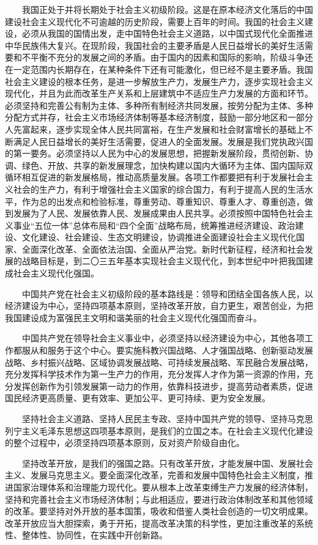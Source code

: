 　　我国正处于并将长期处于社会主义初级阶段。这是在原本经济文化落后的中国建设社会主义现代化不可逾越的历史阶段，需要上百年的时间。我国的社会主义建设，必须从我国的国情出发，走中国特色社会主义道路，以中国式现代化全面推进中华民族伟大复兴。在现阶段，我国社会的主要矛盾是人民日益增长的美好生活需要和不平衡不充分的发展之间的矛盾。由于国内的因素和国际的影响，阶级斗争还在一定范围内长期存在，在某种条件下还有可能激化，但已经不是主要矛盾。我国社会主义建设的根本任务，是进一步解放生产力，发展生产力，逐步实现社会主义现代化，并且为此而改革生产关系和上层建筑中不适应生产力发展的方面和环节。必须坚持和完善公有制为主体、多种所有制经济共同发展，按劳分配为主体、多种分配方式并存，社会主义市场经济体制等基本经济制度，鼓励一部分地区和一部分人先富起来，逐步实现全体人民共同富裕，在生产发展和社会财富增长的基础上不断满足人民日益增长的美好生活需要，促进人的全面发展。发展是我们党执政兴国的第一要务。必须坚持以人民为中心的发展思想，把握新发展阶段，贯彻创新、协调、绿色、开放、共享的新发展理念，加快构建以国内大循环为主体、国内国际双循环相互促进的新发展格局，推动高质量发展。各项工作都要把有利于发展社会主义社会的生产力，有利于增强社会主义国家的综合国力，有利于提高人民的生活水平，作为总的出发点和检验标准，尊重劳动、尊重知识、尊重人才、尊重创造，做到发展为了人民、发展依靠人民、发展成果由人民共享。必须按照中国特色社会主义事业“五位一体”总体布局和“四个全面”战略布局，统筹推进经济建设、政治建设、文化建设、社会建设、生态文明建设，协调推进全面建设社会主义现代化国家、全面深化改革、全面依法治国、全面从严治党。新时代新征程，经济和社会发展的战略目标是，到二〇三五年基本实现社会主义现代化，到本世纪中叶把我国建成社会主义现代化强国。

　　中国共产党在社会主义初级阶段的基本路线是：领导和团结全国各族人民，以经济建设为中心，坚持四项基本原则，坚持改革开放，自力更生，艰苦创业，为把我国建设成为富强民主文明和谐美丽的社会主义现代化强国而奋斗。

　　中国共产党在领导社会主义事业中，必须坚持以经济建设为中心，其他各项工作都服从和服务于这个中心。要实施科教兴国战略、人才强国战略、创新驱动发展战略、乡村振兴战略、区域协调发展战略、可持续发展战略、军民融合发展战略，充分发挥科学技术作为第一生产力的作用，充分发挥人才作为第一资源的作用，充分发挥创新作为引领发展第一动力的作用，依靠科技进步，提高劳动者素质，促进国民经济更高质量、更有效率、更加公平、更可持续、更为安全发展。

　　坚持社会主义道路、坚持人民民主专政、坚持中国共产党的领导、坚持马克思列宁主义毛泽东思想这四项基本原则，是我们的立国之本。在社会主义现代化建设的整个过程中，必须坚持四项基本原则，反对资产阶级自由化。

　　坚持改革开放，是我们的强国之路。只有改革开放，才能发展中国、发展社会主义、发展马克思主义。要全面深化改革，完善和发展中国特色社会主义制度，推进国家治理体系和治理能力现代化。要从根本上改革束缚生产力发展的经济体制，坚持和完善社会主义市场经济体制；与此相适应，要进行政治体制改革和其他领域的改革。要坚持对外开放的基本国策，吸收和借鉴人类社会创造的一切文明成果。改革开放应当大胆探索，勇于开拓，提高改革决策的科学性，更加注重改革的系统性、整体性、协同性，在实践中开创新路。

